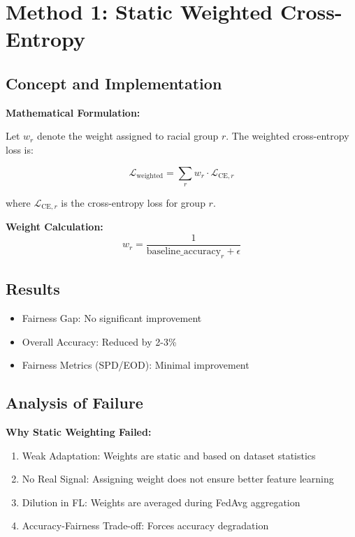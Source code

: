 \documentclass[11pt,a4paper]{report}
\begin{document}
\section{Method 1: Static Weighted Cross-Entropy}

\subsection{Concept and Implementation}

\textbf{Mathematical Formulation:}

Let $w_r$ denote the weight assigned to racial group $r$. The weighted cross-entropy loss is:

\begin{equation}
\mathcal{L}_{\text{weighted}} = \sum_{r} w_r \cdot \mathcal{L}_{\text{CE},r}
\end{equation}

where $\mathcal{L}_{\text{CE},r}$ is the cross-entropy loss for group $r$.

\textbf{Weight Calculation:}
\begin{equation}
w_r = \frac{1}{\text{baseline\_accuracy}_r + \epsilon}
\end{equation}

\subsection{Results}

\begin{itemize}
    \item Fairness Gap: No significant improvement
    \item Overall Accuracy: Reduced by 2-3\%
    \item Fairness Metrics (SPD/EOD): Minimal improvement
\end{itemize}

\subsection{Analysis of Failure}

\textbf{Why Static Weighting Failed:}
\begin{enumerate}
    \item Weak Adaptation: Weights are static and based on dataset statistics
    \item No Real Signal: Assigning weight does not ensure better feature learning
    \item Dilution in FL: Weights are averaged during FedAvg aggregation
    \item Accuracy-Fairness Trade-off: Forces accuracy degradation
\end{enumerate}
\end{document}
